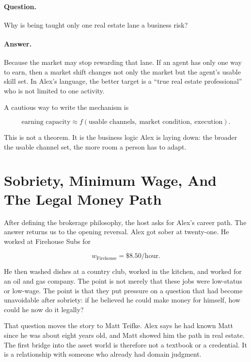 \paragraph{Question.}
Why is being taught only one real estate lane a business risk?

\paragraph{Answer.}
Because the market may stop rewarding that lane. If an agent has only one way to earn, then a market shift changes not only the market but the agent's usable skill set. In Alex's language, the better target is a ``true real estate professional'' who is not limited to one activity.

A cautious way to write the mechanism is

\begin{equation}
\text{earning capacity}
\approx
f(\text{usable channels},\ \text{market condition},\ \text{execution}).
\end{equation}

This is not a theorem. It is the business logic Alex is laying down: the broader the usable channel set, the more room a person has to adapt.

\section{Sobriety, Minimum Wage, And The Legal Money Path}

After defining the brokerage philosophy, the host asks for Alex's career path. The answer returns us to the opening reversal. Alex got sober at twenty-one. He worked at Firehouse Subs for

\begin{equation}
w_{\text{Firehouse}} = \$8.50/\text{hour}.
\end{equation}

He then washed dishes at a country club, worked in the kitchen, and worked for an oil and gas company. The point is not merely that these jobs were low-status or low-wage. The point is that they put pressure on a question that had become unavoidable after sobriety: if he believed he could make money for himself, how could he now do it legally?

That question moves the story to Matt Teifke. Alex says he had known Matt since he was about eight years old, and Matt showed him the path in real estate. The first bridge into the asset world is therefore not a textbook or a credential. It is a relationship with someone who already had domain judgment.

